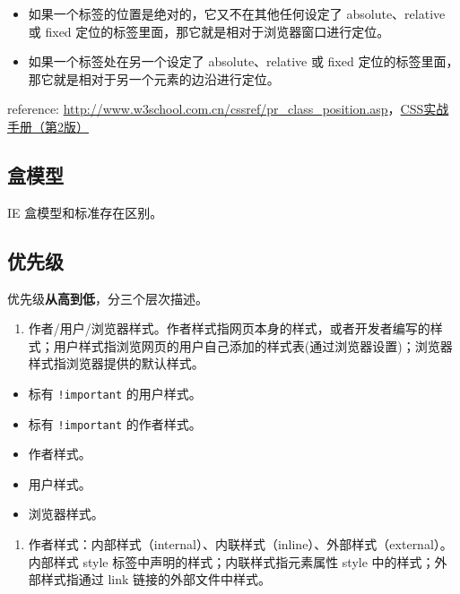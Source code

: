 \begin{itemize}
\tightlist
\item
  如果一个标签的位置是绝对的，它又不在其他任何设定了 absolute、relative
  或 fixed 定位的标签里面，那它就是相对于浏览器窗口进行定位。
\item
  如果一个标签处在另一个设定了 absolute、relative 或 fixed
  定位的标签里面，那它就是相对于另一个元素的边沿进行定位。
\end{itemize}

reference:
\url{http://www.w3school.com.cn/cssref/pr_class_position.asp}，\href{http://book.douban.com/subject/4861462/}{CSS实战手册（第2版）}

\subsection{盒模型}\label{ux76d2ux6a21ux578b}

IE 盒模型和标准存在区别。

\subsection{优先级}\label{ux4f18ux5148ux7ea7}

优先级\textbf{从高到低}，分三个层次描述。

\begin{enumerate}
\def\labelenumi{\arabic{enumi}.}
\tightlist
\item
  作者/用户/浏览器样式。作者样式指网页本身的样式，或者开发者编写的样式；用户样式指浏览网页的用户自己添加的样式表(通过浏览器设置)；浏览器样式指浏览器提供的默认样式。
\end{enumerate}

\begin{itemize}
\tightlist
\item
  标有 \lstinline"!important" 的用户样式。
\item
  标有 \lstinline"!important" 的作者样式。
\item
  作者样式。
\item
  用户样式。
\item
  浏览器样式。
\end{itemize}

\begin{enumerate}
\def\labelenumi{\arabic{enumi}.}
\setcounter{enumi}{1}
\tightlist
\item
  作者样式：内部样式（internal）、内联样式（inline）、外部样式（external）。内部样式
  style 标签中声明的样式；内联样式指元素属性 style
  中的样式；外部样式指通过 link 链接的外部文件中样式。
\end{enumerate}

